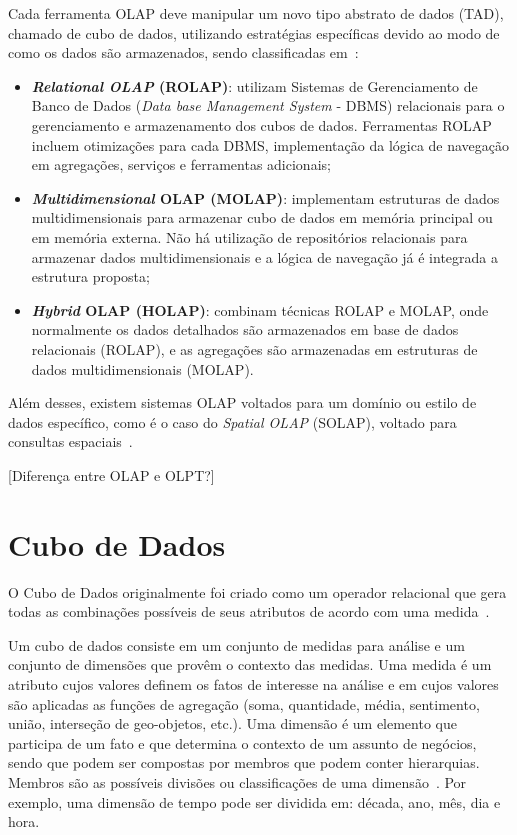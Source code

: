 Cada ferramenta OLAP deve manipular um novo tipo abstrato de dados (TAD), chamado de cubo de dados, utilizando estratégias específicas devido ao modo de como os dados são armazenados, sendo classificadas em~\cite{moreiraFullPartialData2012}:

\begin{itemize}
	\item \textbf{\textit{Relational OLAP} (ROLAP)}: utilizam Sistemas de Gerenciamento de Banco de Dados (\textit{Data base Management System} - DBMS) relacionais para o gerenciamento e armazenamento dos cubos de dados.
Ferramentas ROLAP incluem otimizações para cada DBMS, implementação da lógica de navegação em agregações, serviços e ferramentas adicionais;
	\item \textbf{\textit{Multidimensional} OLAP (MOLAP)}: implementam estruturas de dados multidimensionais para armazenar cubo de dados em memória principal ou em memória externa.
Não há utilização de repositórios relacionais para armazenar dados multidimensionais e a lógica de navegação já é integrada a estrutura proposta;
	\item \textbf{\textit{Hybrid} OLAP (HOLAP)}: combinam técnicas ROLAP e MOLAP, onde normalmente os dados detalhados são armazenados em base de dados relacionais (ROLAP), e as agregações são armazenadas em estruturas de dados multidimensionais (MOLAP).
\end{itemize}

Além desses, existem sistemas OLAP voltados para um domínio ou estilo de dados específico, como é o caso do \textit{Spatial OLAP} (SOLAP), voltado para consultas espaciais~\cite{viswanathanUsercentricSpatialData2014}.

{\color{red}
[Diferença entre OLAP e OLPT?]
}

\section{Cubo de Dados}
\label{ch:fun:cube}

O Cubo de Dados originalmente foi criado como um operador relacional que gera todas as combinações possíveis de seus atributos de acordo com uma medida~\cite{grayDataCubeRelational1996}.

Um cubo de dados consiste em um conjunto de medidas para análise e um conjunto de dimensões que provêm o contexto das medidas.
Uma medida é um atributo cujos valores definem os fatos de interesse na análise e em cujos valores são aplicadas as funções de agregação (soma, quantidade, média, sentimento, união, interseção de geo-objetos, etc.).
Uma dimensão é um elemento que participa de um fato e que determina o contexto de um assunto de negócios, sendo que podem ser compostas por membros que podem conter hierarquias.
Membros são as possíveis divisões ou classificações de uma dimensão~\cite{silva:2015:abordagensParaCubo}.
Por exemplo, uma dimensão de tempo pode ser dividida em: década, ano, mês, dia e hora.

